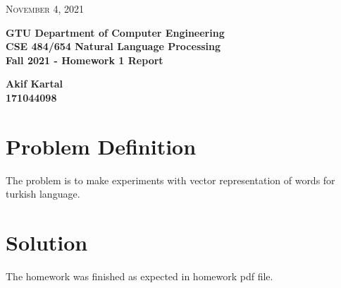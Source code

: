 \documentclass{article}
\begin{document}
\begin{titlepage}

	\begin{flushright}
	\textsc{\large November 4, 2021} \\
	\end{flushright}
	\begin{center}
	\Large{\bfseries GTU Department of Computer Engineering \\ CSE 484/654 Natural Language Processing \\ Fall 2021 - Homework 1 Report  } \\
	\end{center}
	\vspace*{\fill}
	\begin{center}
	\Large{\bfseries Akif Kartal \\ 171044098 }
	\end{center}
	\vspace*{\fill}

\end{titlepage}

\cleardoublepage
\section{Problem Definition} 
The problem is to make experiments with vector representation of words for turkish language.

\section{Solution}
The homework was finished as expected in homework pdf file. 
\end{document}
